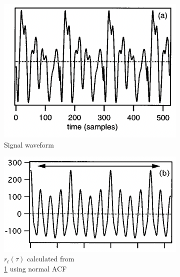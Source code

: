 \begin{enumerate}
    \begin{figure}
        \centering
        \begin{subfigure}{.3\textwidth}
          \centering
          \includegraphics[width=1\linewidth]{Figures/signalwaveform.png}
          \caption{Signal waveform}
          \label{signal}
        \end{subfigure}%
        \begin{subfigure}{.3\textwidth}
            \centering
            \includegraphics[width=1\linewidth]{Figures/acf.png}
            \caption{$r_t(\tau)$ calculated from \\ \cref{signal} using normal ACF}
            \label{acf}
          \end{subfigure}%
        \begin{subfigure}{.3\textwidth}
          \centering

\end{subfigure}
\end{figure}
\end{enumerate}
